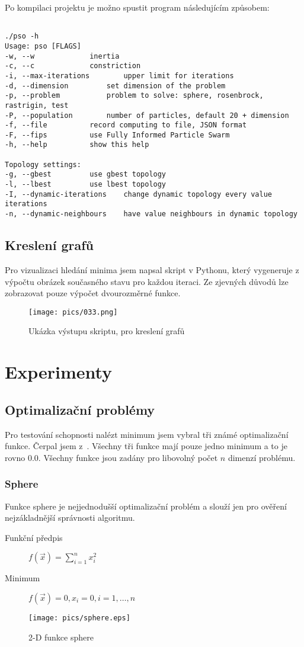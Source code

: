 \documentclass[12pt,a4paper,fleqn]{article}
\begin{document}
Po kompilaci projektu je možno spustit program následujícím způsobem:
\begin{verbatim}

./pso -h
Usage: pso [FLAGS]
-w, --w				inertia
-c, --c				constriction
-i, --max-iterations		upper limit for iterations
-d, --dimension			set dimension of the problem
-p, --problem			problem to solve: sphere, rosenbrock, rastrigin, test
-P, --population		number of particles, default 20 + dimension
-f, --file			record computing to file, JSON format
-F, --fips			use Fully Informed Particle Swarm
-h, --help			show this help

Topology settings:
-g, --gbest			use gbest topology
-l, --lbest			use lbest topology
-I, --dynamic-iterations	change dynamic topology every value iterations
-n, --dynamic-neighbours	have value neighbours in dynamic topology
\end{verbatim}
\subsection{Kreslení grafů}
Pro vizualizaci hledání minima jsem napsal skript v Pythonu, který vygeneruje z výpočtu obrázek současného stavu pro každou iteraci. Ze zjevných důvodů lze zobrazovat pouze výpočet dvourozměrné funkce.
\begin{figure*}[h]
\label{pic:plot-example}
\centering
\texttt{[image: pics/033.png]}
\caption{Ukázka výstupu skriptu, pro kreslení grafů}
\end{figure*}

\section{Experimenty} \label{experimenty}
\blindtext

\subsection{Optimalizační problémy} \label{sec:optimalizacni-problemy}
Pro testování schopnosti nalézt minimum jsem vybral tři známé optimalizační funkce. Čerpal jsem z~\cite{molga2005test}. Všechny tři funkce mají pouze jedno minimum a to je rovno 0.0. Všechny funkce jsou zadány pro libovolný počet $n$ dimenzí problému.

\subsubsection*{Sphere}
Funkce sphere je nejjednodušší optimalizační problém a slouží jen pro ověření nejzákladnější správnosti algoritmu.
\begin{description}
\item[Funkční předpis] $f(\vec{x}) = \sum\limits_{i=1}^n x_i^2$
\item[Minimum] $f(\vec{x}) = 0, x_i = 0, i = 1,\dots,n$
\end{description}
\begin{figure*}[h]
\centering
\texttt{[image: pics/sphere.eps]}
\caption{2-D funkce sphere}
\end{figure*}
\end{document}
